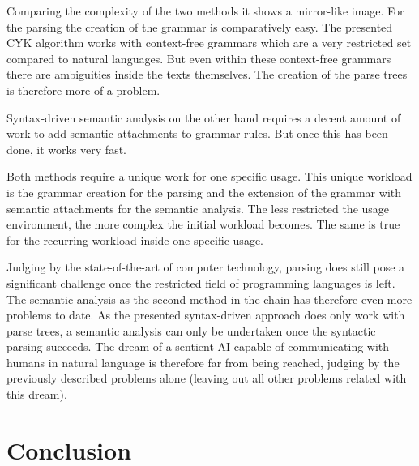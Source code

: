 \documentclass[12pt,twoside]{scrartcl}
\theoremstyle{plain}
\theoremstyle{definition}
\theoremstyle{remark}
\begin{document}
	Comparing the complexity of the two methods it shows a mirror-like image. For the parsing the creation of the grammar is comparatively easy. The presented CYK algorithm works with context-free grammars which are a very restricted set compared to natural languages. But even within these context-free grammars there are ambiguities inside the texts themselves. The creation of the parse trees is therefore more of a problem.
	
	Syntax-driven semantic analysis on the other hand requires a decent amount of work to add semantic attachments to grammar rules. But once this has been done, it works very fast.
	
	Both methods require a unique work for one specific usage. This unique workload is the grammar creation for the parsing and the extension of the grammar with semantic attachments for the semantic analysis. The less restricted the usage environment, the more complex the initial workload becomes. The same is true for the recurring workload inside one specific usage.
	
	Judging by the state-of-the-art of computer technology, parsing does still pose a significant challenge once the restricted field of programming languages is left. The semantic analysis as the second method in the chain has therefore even more problems to date. As the presented syntax-driven approach does only work with parse trees, a semantic analysis can only be undertaken once the syntactic parsing succeeds. The dream of a sentient AI capable of communicating with humans in natural language is therefore far from being reached, judging by the previously described problems alone (leaving out all other problems related with this dream).
	
\section{Conclusion}
\label{sec:concl}

	

%
%
\clearpage


\end{document}
